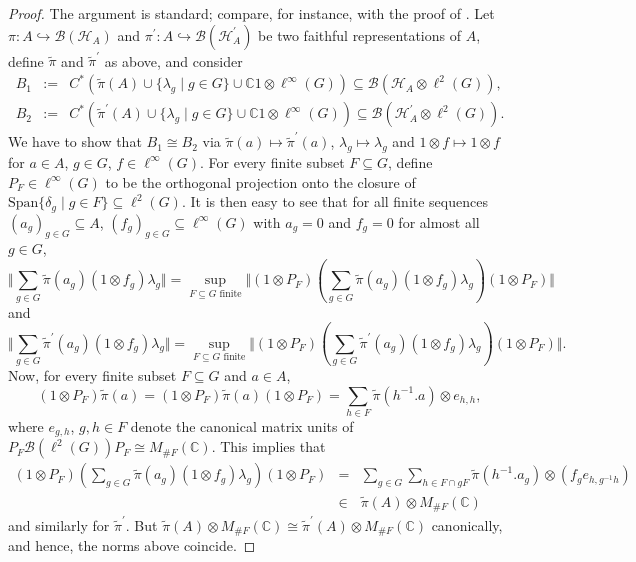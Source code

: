 \documentclass[a4paper,11pt,reqno]{amsart}
\numberwithin{equation}{section}
\numberwithin{equation}{section}
\theoremstyle{definition}
\theoremstyle{remark}
\theoremstyle{remark}
\begin{document}
\begin{proof} The argument is standard; compare, for instance, with
the proof of \cite[Proposition 4.1.5]{BrownOzawa}. Let $\pi:A\hookrightarrow\mathcal{B}(\mathcal{H}_{A})$
and $\pi^{\prime}:A\hookrightarrow\mathcal{B}(\mathcal{H}_{A}^{\prime})$
be two faithful representations of $A$, define $\widetilde{\pi}$
and $\widetilde{\pi}^{\prime}$ as above, and consider 
\begin{eqnarray*}
B_{1} & := & C^{\ast}(\widetilde{\pi}(A)\cup\{\lambda_{g}\mid g\in G\}\cup\mathbb{C}1\otimes\ell^{\infty}(G))\subseteq\mathcal{B}(\mathcal{H}_{A}\otimes\ell^{2}(G)),\\
B_{2} & := & C^{\ast}(\widetilde{\pi}^{\prime}(A)\cup\{\lambda_{g}\mid g\in G\}\cup\mathbb{C}1\otimes\ell^{\infty}(G))\subseteq\mathcal{B}(\mathcal{H}_{A}^{\prime}\otimes\ell^{2}(G)).
\end{eqnarray*}
We have to show that $B_{1}\cong B_{2}$ via $\widetilde{\pi}(a)\mapsto\widetilde{\pi}^{\prime}(a)$,
$\lambda_{g}\mapsto\lambda_{g}$ and $1\otimes f\mapsto1\otimes f$
for $a\in A$, $g\in G$, $f\in\ell^{\infty}(G)$. For every finite
subset $F\subseteq G$, define $P_{F}\in\ell^{\infty}(G)$ to be the
orthogonal projection onto the closure of $\text{Span}\{\delta_{g}\mid g\in F\}\subseteq\ell^{2}(G)$.
It is then easy to see that for all finite sequences $(a_{g})_{g\in G}\subseteq A$,
$(f_{g})_{g\in G}\subseteq\ell^{\infty}(G)$ with $a_{g}=0$ and $f_{g}=0$
for almost all $g\in G$, 
\[
\Vert\sum_{g\in G}\widetilde{\pi}(a_{g})(1\otimes f_{g})\lambda_{g}\Vert=\sup_{F\subseteq G\text{ finite}}\Vert(1\otimes P_{F})(\sum_{g\in G}\widetilde{\pi}(a_{g})(1\otimes f_{g})\lambda_{g})(1\otimes P_{F})\Vert
\]
and 
\[
\Vert\sum_{g\in G}\widetilde{\pi}^{\prime}(a_{g})(1\otimes f_{g})\lambda_{g}\Vert=\sup_{F\subseteq G\text{ finite}}\Vert(1\otimes P_{F})(\sum_{g\in G}\widetilde{\pi}^{\prime}(a_{g})(1\otimes f_{g})\lambda_{g})(1\otimes P_{F})\Vert.
\]
Now, for every finite subset $F\subseteq G$ and $a\in A$, 
\[
(1\otimes P_{F})\widetilde{\pi}(a)=(1\otimes P_{F})\widetilde{\pi}(a)(1\otimes P_{F})=\sum_{h\in F}\widetilde{\pi}(h^{-1}.a)\otimes e_{h,h},
\]
where $e_{g,h}$, $g,h\in F$ denote the canonical matrix units of
$P_{F}\mathcal{B}(\ell^{2}(G))P_{F}\cong M_{\#F}(\mathbb{C})$. This
implies that 
\begin{eqnarray*}
(1\otimes P_{F})(\sum_{g\in G}\widetilde{\pi}(a_{g})(1\otimes f_{g})\lambda_{g})(1\otimes P_{F}) & = & \sum_{g\in G}\sum_{h\in F\cap gF}\widetilde{\pi}(h^{-1}.a_{g})\otimes(f_{g}e_{h,g^{-1}h})\\
 & \in & \widetilde{\pi}(A)\otimes M_{\#F}(\mathbb{C})
\end{eqnarray*}
and similarly for $\widetilde{\pi}^{\prime}$. But $\widetilde{\pi}(A)\otimes M_{\#F}(\mathbb{C})\cong\widetilde{\pi}^{\prime}(A)\otimes M_{\#F}(\mathbb{C})$
canonically, and hence, the norms above coincide. \end{proof}
\end{document}
